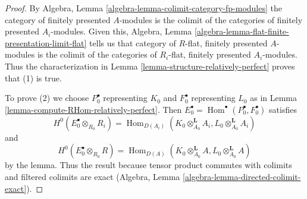 \documentclass[10pt,a4paper]{amsart}
\theoremstyle{plain}
\theoremstyle{definition}
\theoremstyle{remark}
\numberwithin{equation}{subsection}
\def\Hom{\mathop{\mathrm{Hom}}\nolimits}
\begin{document}
\begin{proof}
By Algebra, Lemma \ref{algebra-lemma-colimit-category-fp-modules}
the category of finitely presented $A$-modules is the colimit of
the categories of finitely presented $A_i$-modules.
Given this, Algebra, Lemma
\ref{algebra-lemma-flat-finite-presentation-limit-flat}
tells us that category of $R$-flat, finitely presented $A$-modules
is the colimit of the categories of
$R_i$-flat, finitely presented $A_i$-modules.
Thus the characterization in
Lemma \ref{lemma-structure-relatively-perfect}
proves that (1) is true.

\medskip\noindent
To prove (2) we choose $P_0^\bullet$ representing $K_0$ and
$F_0^\bullet$ representing $L_0$ as in
Lemma \ref{lemma-compute-RHom-relatively-perfect}.
Then $E_0^\bullet = \Hom^\bullet(P_0^\bullet, F_0^\bullet)$
satisfies
$$
H^0(E_0^\bullet \otimes_{R_0} R_i) =
\Hom_{D(A_i)}(K_0 \otimes_{A_0}^\mathbf{L} A_i,
L_0 \otimes_{A_0}^\mathbf{L} A_i)
$$
and
$$
H^0(E_0^\bullet \otimes_{R_0} R) =
\Hom_{D(A)}(K_0 \otimes_{A_0}^\mathbf{L} A, L_0 \otimes_{A_0}^\mathbf{L} A)
$$
by the lemma. Thus the result because tensor product commutes
with colimits and filtered colimits are exact
(Algebra, Lemma \ref{algebra-lemma-directed-colimit-exact}).
\end{proof}
\end{document}
